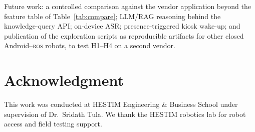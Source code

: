\documentclass[conference]{IEEEtran}
\newcommand{\ros}{\textsc{ros}}
\begin{document}
Future work: a controlled comparison against the vendor application beyond the feature table of Table~\ref{tab:compare}; LLM/RAG reasoning behind the knowledge-query API; on-device ASR; presence-triggered kiosk wake-up; and publication of the exploration scripts as reproducible artifacts for other closed Android--\ros{} robots, to test H1--H4 on a second vendor.

\section*{Acknowledgment}

This work was conducted at HESTIM Engineering \& Business School under supervision of Dr.~Sridath Tula.
We thank the HESTIM robotics lab for robot access and field testing support.

\nocite{cybel2026}
\clearpage


\end{document}
